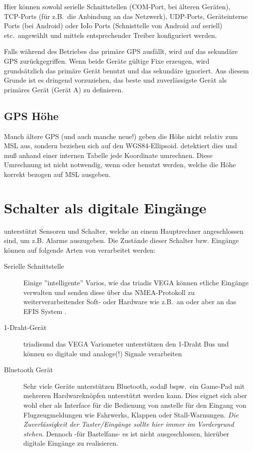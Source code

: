 Hier können sowohl serielle Schnittstellen (COM-Port, bei älteren Geräten), TCP-Ports (für z.B.\ die Anbindung an das Netzwerk), UDP-Ports, Geräteinterne Ports (bei Android) oder IoIo Ports (Schnisttelle von Android auf seriell) etc.\ angewählt und mittels entsprechender Treiber konfiguriert werden.  


Falls während des Betriebes das primäre GPS ausfällt, wird auf das sekundäre GPS zurückgegriffen. Wenn beide Geräte gültige Fixe erzeugen, wird grundsätzlich das primäre Gerät benutzt und das sekundäre ignoriert.  Aus diesem Grunde ist es dringend vorzuziehen, das beste und zuverlässigste Gerät als primäres Gerät (Gerät A) zu definieren.

\subsection*{GPS Höhe}

Manch ältere GPS  (und auch manche neue!) geben die Höhe nicht relativ zum MSL aus, sondern beziehen sich auf den WGS84-Ellipsoid.  \xc detektiert dies und muß anhand einer internen Tabelle jede Koordinate umrechnen. Diese Umrechnung ist nicht notwendig, wenn \fl oder \al benutzt werden, welche die Höhe korrekt bezogen auf MSL ausgeben.
\section{Schalter als digitale Eingänge}

\xc unterstützt Sensoren und Schalter, welche an einem Hauptrechner angeschlossen sind, um z.B. Alarme auszugeben. Die Zustände dieser Schalter bzw. Eingänge können auf folgende Arten von \xc verarbeitet werden:

\begin{description}
     \item[Serielle Schnittstelle]  Einige ''intelligente'' Varios, wie das \textsf{triadis} VEGA  können etliche Eingänge verwalten und senden diese über das NMEA-Protokoll zu weiterverarbeitender Soft- oder Hardware wie z.B.\ an \xc oder aber an das EFIS System \al.
     \item[1-Draht-Gerät]  \textsf{triadis}\al und das VEGA Variometer unterstützen den 1-Draht Bus und können so digitale und analoge(!) Signale verarbeiten
     \item[Bluetooth Gerät]  Sehr viele Geräte unterstützen Bluetooth, sodaß bspw.\ ein Game-Pad mit mehreren  Hardwareknöpfen unterstützt werden kann. 
     Dies eignet sich aber wohl eher als Interface für die Bedienung von \xc anstelle für den Eingang von Flugzeugmeldungen wie Fahrwerks, Klappen oder Stall-Warnungen.
     \textsl{Die Zuverlässigkeit der Taster/Eingänge sollte hier immer im Vordergrund stehen}.
        Dennoch -für Bastelfans- es ist nicht ausgeschlossen, hierüber digitale Eingänge zu realisieren.
\end{description}

